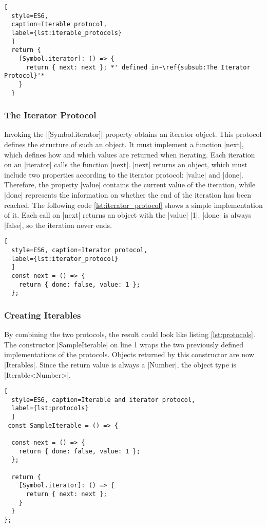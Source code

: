 \begin{lstlisting}[
  style=ES6, 
  caption=Iterable protocol,
  label={lst:iterable_protocols}
  ]
  return {
    [Symbol.iterator]: () => {
      return { next: next }; *' defined in~\ref{subsub:The Iterator Protocol}'*
    }
  }
\end{lstlisting}

\subsubsection{The Iterator Protocol}
\label{subsub:The Iterator Protocol}
Invoking the |[Symbol.iterator]| property obtains an iterator object.
This protocol defines the structure of such an object. It must 
implement a function |next|, which defines how and which values are returned 
when iterating.
Each iteration on an |iterator| calls the function |next|. |next| returns an object, which must
include two properties according to the iterator protocol: |value| and |done|.
Therefore, the property |value| contains the current value of the iteration,
while |done| represents the information on whether the end of the iteration has 
been reached. The following code \ref{lst:iterator_protocol} shows a simple 
implementation of it. Each call on |next| returns an object with the |value| 
|1|. |done| is always |false|, so the iteration never ends. 

\begin{lstlisting}[
  style=ES6, caption=Iterator protocol,
  label={lst:iterator_protocol}
  ]
  const next = () => {
    return { done: false, value: 1 };
  };
\end{lstlisting}

\subsubsection{Creating Iterables}
\label{subsub:Creating Iterables}
By combining the two protocols, the result could look like listing
\ref{lst:protocols}. The constructor |SampleIterable| on line 1 wraps the two previously
defined implementations of the protocols. Objects returned by this constructor 
are now |Iterables|. Since the return value is always a |Number|, the object type
is |Iterable<Number>|.

\begin{lstlisting}[
  style=ES6, caption=Iterable and iterator protocol,
  label={lst:protocols}
  ]
 const SampleIterable = () => {

  const next = () => {
    return { done: false, value: 1 };
  };

  return {
    [Symbol.iterator]: () => {
      return { next: next };
    }
  }
};
\end{lstlisting}

